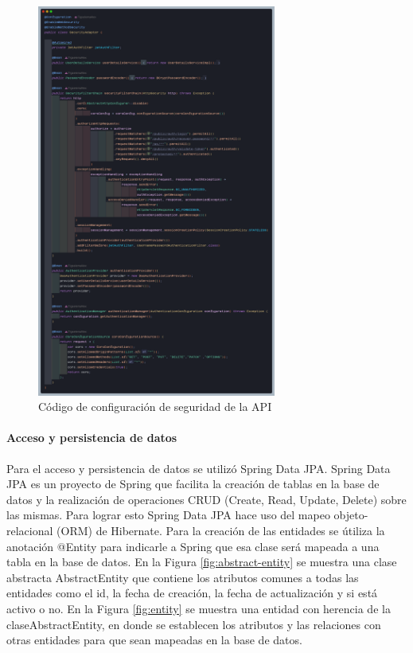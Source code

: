 \begin{figure}[H]
    \centering
    \includegraphics[width=0.7\textwidth]{resources/images/security}
    \caption{Código de configuración de seguridad de la API}
    \label{fig:security}
\end{figure}

\paragraph{Acceso y persistencia de datos}

Para el acceso y persistencia de datos se utilizó Spring Data JPA.
Spring Data JPA es un proyecto de Spring que facilita la creación de tablas en la base de datos y la realización de operaciones CRUD (Create, Read, Update, Delete) sobre las mismas.
Para lograr esto Spring Data JPA hace uso del mapeo objeto-relacional (ORM) de Hibernate.
\bigbreak
Para la creación de las entidades se útiliza la anotación @Entity para indicarle a Spring que esa clase será mapeada a una tabla en la base de datos.
En la Figura \ref{fig:abstract-entity} se muestra una clase abstracta AbstractEntity que contiene los atributos comunes a todas las entidades como el id, la fecha de creación, la fecha de actualización y si está activo o no.
En la Figura \ref{fig:entity} se muestra una entidad con herencia de la claseAbstractEntity, en donde se establecen los atributos y las relaciones con otras entidades para que sean mapeadas en la base de datos.

